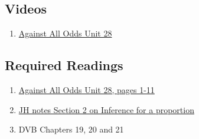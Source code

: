 \documentclass[letterpaper,10pt,twocolumn,twoside,printwatermark=false]{pinp}
\providecommand{\tightlist}{%
  \setlength{\itemsep}{0pt}\setlength{\parskip}{0pt}}
\begin{document}
\hypertarget{videos-3}{%
\subsection{Videos}\label{videos-3}}

\begin{enumerate}
\def\labelenumi{\arabic{enumi}.}
\tightlist
\item
  \href{https://www.learner.org/courses/againstallodds/unitpages/unit28.html}{Against
  All Odds Unit 28}
\end{enumerate}

\hypertarget{required-readings-4}{%
\subsection{Required Readings}\label{required-readings-4}}

\begin{enumerate}
\item \href{https://www.learner.org/courses/againstallodds/pdfs/AgainstAllOdds_StudentGuide_Unit28.pdf#page=1}{Against All Odds Unit 28, pages 1-11}
\item \href{https://www.dropbox.com/s/g1ui3xg8nup1p6b/proportion-model-inference-plan-2018.pdf?dl=0}{JH notes Section 2 on Inference for a proportion}
\item DVB Chapters 19, 20 and 21
\end{enumerate}





\end{document}
